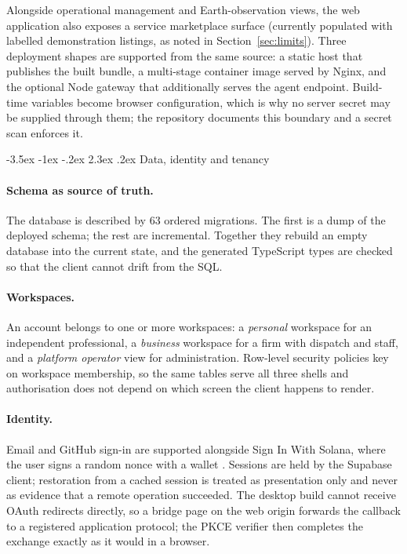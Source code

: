 \documentclass[10pt,a4paper,twocolumn]{article}
\makeatletter
\renewcommand\section{\@startsection{section}{1}{\z@}
  {-3.5ex \@plus -1ex \@minus -.2ex}
  {2.3ex \@plus.2ex}
  {\normalfont\Large\bfseries\hyphenpenalty=10000\exhyphenpenalty=10000}}
\makeatother
\begin{document}
Alongside operational management and Earth-observation views, the web application
also exposes a service marketplace surface (currently populated with labelled
demonstration listings, as noted in Section~\ref{sec:limits}). Three deployment
shapes are supported from the same source: a static host that publishes the built
bundle, a multi-stage container image served by Nginx, and the optional Node
gateway that additionally serves the agent endpoint. Build-time variables become
browser configuration, which is why no server secret may be supplied through them;
the repository documents this boundary and a secret scan enforces it.

\section{Data, identity and tenancy}
\label{sec:data}

\paragraph{Schema as source of truth.}
The database is described by 63 ordered migrations. The first is a dump of the
deployed schema; the rest are incremental. Together they rebuild an empty database
into the current state, and the generated TypeScript types are checked so that the
client cannot drift from the SQL.

\paragraph{Workspaces.}
An account belongs to one or more workspaces: a \emph{personal} workspace for an
independent professional, a \emph{business} workspace for a firm with dispatch and
staff, and a \emph{platform operator} view for administration. Row-level security
\cite{pg-rls} policies key on workspace membership, so the same tables serve all three
shells and authorisation does not depend on which screen the client happens to render.

\paragraph{Identity.}
Email and GitHub sign-in are supported alongside Sign In With Solana, where the user
signs a random nonce with a wallet \cite{walletstandard}. Sessions are held by the Supabase client;
restoration from a cached session is treated as presentation only and never as
evidence that a remote operation succeeded. The desktop build cannot receive OAuth
redirects directly, so a bridge page on the web origin forwards the callback to a
registered application protocol; the PKCE verifier then completes the exchange
exactly as it would in a browser.
\end{document}
